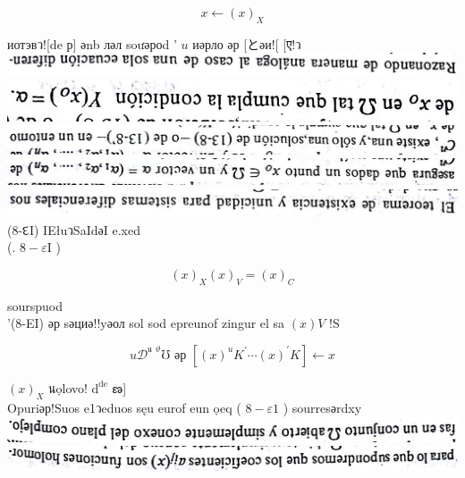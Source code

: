 \documentclass[10pt]{article}
\theoremstyle{plain}
\theoremstyle{definition}
\theoremstyle{remark}
\begin{document}
$$
x \leftarrow(x)_{X}
$$

иотэвว![de р] әnb ләл soưәроd ' $u$ иәрло әр [とәи![ [ए!ว\\
\includegraphics[max width=\textwidth, center]{2025_09_05_adecef5eb2053bc129b5g-331(1)}\\
\includegraphics[max width=\textwidth, center]{2025_09_05_adecef5eb2053bc129b5g-331(7)}\\
\includegraphics[max width=\textwidth, center]{2025_09_05_adecef5eb2053bc129b5g-331}\\
\includegraphics[max width=\textwidth, center]{2025_09_05_adecef5eb2053bc129b5g-331(4)}\\
\includegraphics[max width=\textwidth, center]{2025_09_05_adecef5eb2053bc129b5g-331(2)}\\
(8-દI) IEłuวSaIdәI e.xed\\
(. $8-\varepsilon \mathrm{I}$ )

$$
(x)_{X}(x)_{V}=(x)_{C}
$$

sourspuod\\
'(8-EI) әр sәциә!!yәол sol sod epreunof zingur el sa $(x) V$ !S

$$
u \mathcal{D}^{\text {แ } \vartheta} \mho \text { әр }\left[(x)^{u} K^{\prime} \cdots(x)^{\prime} K\right] \leftarrow x
$$

$(x)_{X}$ นọlovo! $\mathrm{d}^{\mathrm{d} \mathrm{e}}$ ణ]\\
Opuriәр!Suos e1วeduos sęu eurof eun ọeq ( $8-\varepsilon 1$ ) sourresәrdxy\\
\includegraphics[max width=\textwidth, center]{2025_09_05_adecef5eb2053bc129b5g-331(6)}\\
\includegraphics[max width=\textwidth, center]{2025_09_05_adecef5eb2053bc129b5g-331(9)}
\end{document}
